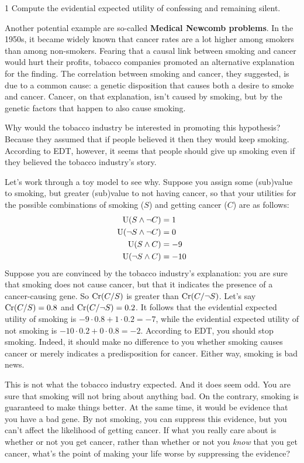 \begin{exercise}{1}
  Compute the evidential expected utility of confessing and remaining
  silent. 
\end{exercise}

Another potential example are so-called \textbf{Medical Newcomb problems}. In
the 1950s, it became widely known that cancer rates are a lot higher among
smokers than among non-smokers. Fearing that a causal link between smoking and
cancer would hurt their profits, tobacco companies promoted an alternative
explanation for the finding. The correlation between smoking and cancer, they
suggested, is due to a common cause: a genetic disposition that causes both a
desire to smoke and cancer. Cancer, on that explanation, isn't caused by
smoking, but by the genetic factors that happen to also cause smoking.

Why would the tobacco industry be interested in promoting this hypothesis?
Because they assumed that if people believed it then they would keep smoking.
According to EDT, however, it seems that people should give up smoking even if
they believed the tobacco industry's story.

Let's work through a toy model to see why. Suppose you assign some (sub)value to
smoking, but greater (sub)value to not having cancer, so that your utilities for
the possible combinations of smoking ($S$) and getting cancer ($C$) are as
follows:
%
\begin{align*}
\text{U}(S \land \neg C) &= 1\\
\text{U}(\neg S \land \neg C) &= 0\\
\text{U}(S \land C) &= -9\\
\text{U}(\neg S \land C) &= -10
\end{align*}
Suppose you are convinced by the tobacco industry's explanation: you are sure
that smoking does not cause cancer, but that it indicates the presence of a
cancer-causing gene. So $\text{Cr}(C/S)$ is greater than $\text{Cr}(C/\neg S)$. Let's say
$\text{Cr}(C/S) = 0.8$ and $\text{Cr}(C/\neg S) = 0.2$. It follows that the evidential
expected utility of smoking is $-9 \cdot 0.8 + 1 \cdot 0.2 = -7$, while the
evidential expected utility of not smoking is
$-10 \cdot 0.2 + 0 \cdot 0.8 = -2$. According to EDT, you should stop smoking.
Indeed, it should make no difference to you whether smoking causes cancer or
merely indicates a predisposition for cancer. Either way, smoking is bad news.

This is not what the tobacco industry expected. And it does seem odd. You are
sure that smoking will not bring about anything bad. On the contrary, smoking is
guaranteed to make things better. At the same time, it would be evidence that
you have a bad gene. By not smoking, you can suppress this evidence, but you
can't affect the likelihood of getting cancer. If what you really care about is
whether or not you get cancer, rather than whether or not you \emph{know} that
you get cancer, what's the point of making your life worse by suppressing the
evidence?


